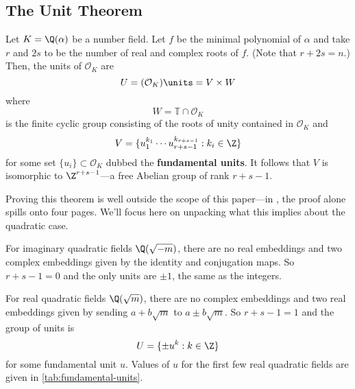 \subsection{The Unit Theorem}

\begin{theorem}
    Let $K = \Q(\alpha)$ be a number field. Let $f$ be the minimal polynomial of $\alpha$ and take $r$ and $2s$ to be the number of real and complex roots of $f$. (Note that $r + 2s = n$.) Then, the units of $\mathcal O_K$ are
    \begin{equation}
        U = (\mathcal O_K) \units = V \times W
    \end{equation}
    where
    \begin{equation}
        W = \mathbb T \cap \mathcal O_K
    \end{equation}
    is the finite cyclic group consisting of the roots of unity contained in $\mathcal O_K$ and
    \begin{equation}
        V = \{ u_1^{k_1} \cdots u_{r + s - 1}^{k_{r + s - 1}} : k_i \in \Z \}
    \end{equation}
    for some set $\{ u_i \} \subset \mathcal O_K$ dubbed the \textbf{fundamental units}.
    It follows that $V$ is isomorphic to $\Z^{r + s - 1}$---a free Abelian group of rank $r + s - 1$.
\end{theorem}

Proving this theorem is well outside the scope of this paper---in \textcite{marcus}, the proof alone spills onto four pages. We'll focus here on unpacking what this implies about the quadratic case.

For imaginary quadratic fields $\Q(\sqrt{-m})$, there are no real embeddings and two complex embeddings given by the identity and conjugation maps. So $r + s - 1 = 0$ and the only units are $\pm 1$, the same as the integers.

For real quadratic fields $\Q(\sqrt{m})$, there are no complex embeddings and two real embeddings given by sending $a + b \sqrt{m}$ to $a \pm b \sqrt{m}$. So $r + s - 1 = 1$ and the group of units is
\begin{equation}
    U = \{ \pm u^k : k \in \Z \}
\end{equation}
for some fundamental unit $u$. Values of $u$ for the first few real quadratic fields are given in \autoref{tab:fundamental-units}.

